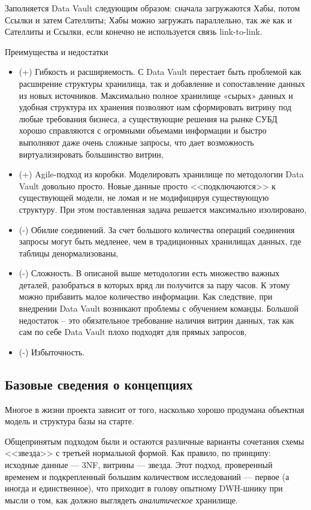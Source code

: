 \documentclass[%
	11pt,
	a4paper,
	utf8,
		]{article}
\begin{document}
Заполняется Data Vault следующим образом: сначала загружаются Хабы, потом Ссылки и затем Сателлиты; Хабы можно загружать параллельно, так же как и Сателлиты и Ссылки, если конечно не используется связь link-to-link.

Преимущества и недостатки
\begin{itemize}
	\item (+) Гибкость и расширяемость. С Data Vault перестает быть проблемой как расширение структуры хранилища, так и добавление и сопоставление данных из новых источников. Максимально полное хранилище «сырых» данных и удобная структура их хранения позволяют нам сформировать витрину под любые требования бизнеса, а существующие решения на рынке СУБД хорошо справляются с огромными объемами информации и быстро выполняют даже очень сложные запросы, что дает возможность виртуализировать большинство витрин,
	
	\item (+) Agile-подход из коробки. Моделировать хранилище по методологии Data Vault довольно просто. Новые данные просто <<подключаются>> к существующей модели, не ломая и не модифицируя существующую структуру. При этом поставленная задача решается максимально изолировано,
	
	\item (-) Обилие соединений. За счет большого количества операций соединения запросы могут быть медленее, чем в традиционных хранилищах данных, где таблицы денормализованы,
	
	\item (-) Сложность. В описаной выше методологии есть множество важных деталей, разобраться в которых вряд ли получится за пару часов. К этому можно прибавить малое количество информации. Как следствие, при внедрении Data Vault возникают проблемы с обучением команды. Большой недостаток -- это обязательное требование наличия витрин данных, так как сам по себе Data Vault плохо подходят для прямых запросов,
	
	\item (-) Избыточность.
\end{itemize}


\subsection{Базовые сведения о концепциях}

Многое в жизни проекта зависит от того, насколько хорошо продумана объектная модель и структура базы на старте.

Общепринятым подходом были и остаются различные варианты сочетания схемы <<звезда>> с третьей нормальной формой. Как правило, по принципу: исходные данные — 3NF, витрины — звезда. Этот подход, проверенный временем и подкрепленный большим количеством исследований — первое (а иногда и единственное), что приходит в голову опытному DWH-шнику при мысли о том, как должно выглядеть \emph{аналитическое} хранилище.
\end{document}
